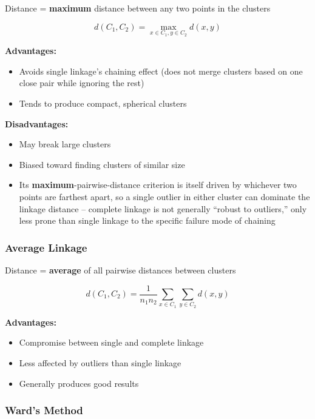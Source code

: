 \documentclass[
]{article}
\begin{document}
Distance = \textbf{maximum} distance between any two points in the
clusters

\[d\left( C_{1},C_{2} \right) = \max\limits_{x \in C_{1},y \in C_{2}}d(x,y)\]

\textbf{Advantages:}

\begin{itemize}
\item
  Avoids single linkage's chaining effect (does not merge clusters based
  on one close pair while ignoring the rest)
\item
  Tends to produce compact, spherical clusters
\end{itemize}

\textbf{Disadvantages:}

\begin{itemize}
\item
  May break large clusters
\item
  Biased toward finding clusters of similar size
\item
  Its \textbf{maximum}-pairwise-distance criterion is itself driven by
  whichever two points are farthest apart, so a single outlier in either
  cluster can dominate the linkage distance -- complete linkage is not
  generally ``robust to outliers,'' only less prone than single linkage
  to the specific failure mode of chaining
\end{itemize}

\subsubsection{Average Linkage}

Distance = \textbf{average} of all pairwise distances between clusters

\[d\left( C_{1},C_{2} \right) = \frac{1}{n_{1}n_{2}}\sum_{x \in C_{1}}\sum_{y \in C_{2}}d(x,y)\]

\textbf{Advantages:}

\begin{itemize}
\item
  Compromise between single and complete linkage
\item
  Less affected by outliers than single linkage
\item
  Generally produces good results
\end{itemize}

\subsubsection{Ward's Method}
\end{document}
